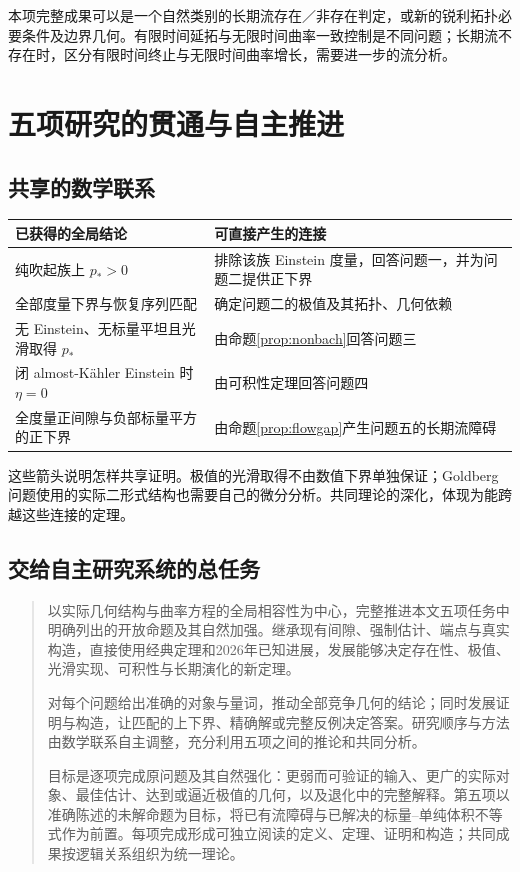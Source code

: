 \documentclass[11pt,a4paper]{article}
\newcommand{\Ka}{K{\latin\"a}hler}
\theoremstyle{definition}
\numberwithin{equation}{section}
\begin{document}
本项完整成果可以是一个自然类别的长期流存在／非存在判定，或新的锐利拓扑必要条件及边界几何。有限时间延拓与无限时间曲率一致控制是不同问题；长期流不存在时，区分有限时间终止与无限时间曲率增长，需要进一步的流分析。

\section{五项研究的贯通与自主推进}

\subsection{共享的数学联系}
\begin{center}
\begin{tabularx}{\textwidth}{@{}p{}Y@{}}
\toprule
已获得的全局结论 & 可直接产生的连接\\
\midrule
纯吹起族上 $p_*>0$ & 排除该族 Einstein 度量，回答问题一，并为问题二提供正下界\\
全部度量下界与恢复序列匹配 & 确定问题二的极值及其拓扑、几何依赖\\
无 Einstein、无标量平坦且光滑取得 $p_*$ & 由命题\ref{prop:nonbach}回答问题三\\
闭 almost-\Ka{} Einstein 时 $\eta=0$ & 由可积性定理回答问题四\\
全度量正间隙与负部标量平方的正下界 & 由命题\ref{prop:flowgap}产生问题五的长期流障碍\\
\bottomrule
\end{tabularx}
\end{center}

这些箭头说明怎样共享证明。极值的光滑取得不由数值下界单独保证；Goldberg 问题使用的实际二形式结构也需要自己的微分分析。共同理论的深化，体现为能跨越这些连接的定理。

\subsection{交给自主研究系统的总任务}
\begin{quote}
以实际几何结构与曲率方程的全局相容性为中心，完整推进本文五项任务中明确列出的开放命题及其自然加强。继承现有间隙、强制估计、端点与真实构造，直接使用经典定理和2026年已知进展，发展能够决定存在性、极值、光滑实现、可积性与长期演化的新定理。

对每个问题给出准确的对象与量词，推动全部竞争几何的结论；同时发展证明与构造，让匹配的上下界、精确解或完整反例决定答案。研究顺序与方法由数学联系自主调整，充分利用五项之间的推论和共同分析。

目标是逐项完成原问题及其自然强化：更弱而可验证的输入、更广的实际对象、最佳估计、达到或逼近极值的几何，以及退化中的完整解释。第五项以准确陈述的未解命题为目标，将已有流障碍与已解决的标量--单纯体积不等式作为前置。每项完成形成可独立阅读的定义、定理、证明和构造；共同成果按逻辑关系组织为统一理论。
\end{quote}
\end{document}
